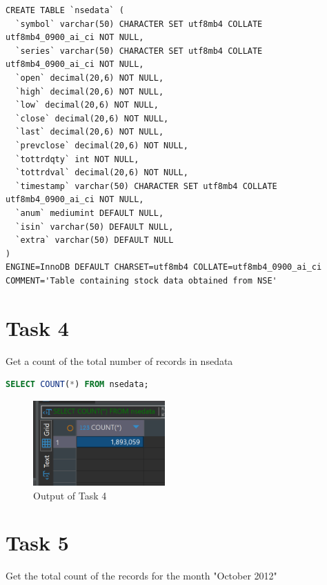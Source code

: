 \documentclass{article}
\begin{document}
\begin{lstlisting}[caption=Schema Dump of Table nsedata]
CREATE TABLE `nsedata` (
  `symbol` varchar(50) CHARACTER SET utf8mb4 COLLATE utf8mb4_0900_ai_ci NOT NULL,
  `series` varchar(50) CHARACTER SET utf8mb4 COLLATE utf8mb4_0900_ai_ci NOT NULL,
  `open` decimal(20,6) NOT NULL,
  `high` decimal(20,6) NOT NULL,
  `low` decimal(20,6) NOT NULL,
  `close` decimal(20,6) NOT NULL,
  `last` decimal(20,6) NOT NULL,
  `prevclose` decimal(20,6) NOT NULL,
  `tottrdqty` int NOT NULL,
  `tottrdval` decimal(20,6) NOT NULL,
  `timestamp` varchar(50) CHARACTER SET utf8mb4 COLLATE utf8mb4_0900_ai_ci NOT NULL,
  `anum` mediumint DEFAULT NULL,
  `isin` varchar(50) DEFAULT NULL,
  `extra` varchar(50) DEFAULT NULL
) 
ENGINE=InnoDB DEFAULT CHARSET=utf8mb4 COLLATE=utf8mb4_0900_ai_ci COMMENT='Table containing stock data obtained from NSE'
\end{lstlisting}

\clearpage

\section*{Task 4}

\begin{task*}[4]
Get a count of the total number of records in nsedata
\end{task*}

\begin{lstlisting}[language=SQL, caption=Counting the Total Number of Records]
SELECT COUNT(*) FROM nsedata;
\end{lstlisting}

\begin{figure}[H]
	\centering
	\includegraphics[width=0.45\textwidth]{Images/Task4.png}
	\caption{Output of Task 4}
\end{figure}

\section*{Task 5}

\begin{task*}[5]
Get the total count of the records for the month "October 2012"
\end{task*}
\end{document}
